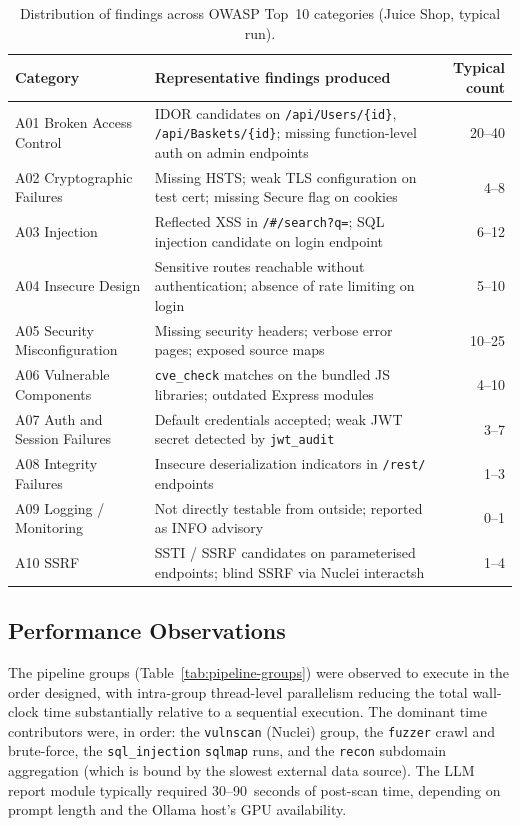 \begin{table}[h]
\centering
\small
\begin{tabular}{|l|p{7cm}|r|}
\hline
\textbf{Category} & \textbf{Representative findings produced} & \textbf{Typical count} \\
\hline
A01 Broken Access Control     & IDOR candidates on \texttt{/api/Users/\{id\}}, \texttt{/api/Baskets/\{id\}}; missing function-level auth on admin endpoints & 20--40 \\
A02 Cryptographic Failures    & Missing HSTS; weak TLS configuration on test cert; missing Secure flag on cookies & 4--8 \\
A03 Injection                 & Reflected XSS in \texttt{/\#/search?q=}; SQL injection candidate on login endpoint & 6--12 \\
A04 Insecure Design           & Sensitive routes reachable without authentication; absence of rate limiting on login & 5--10 \\
A05 Security Misconfiguration & Missing security headers; verbose error pages; exposed source maps & 10--25 \\
A06 Vulnerable Components     & \texttt{cve\_check} matches on the bundled JS libraries; outdated Express modules & 4--10 \\
A07 Auth and Session Failures & Default credentials accepted; weak JWT secret detected by \texttt{jwt\_audit} & 3--7 \\
A08 Integrity Failures        & Insecure deserialization indicators in \texttt{/rest/} endpoints & 1--3 \\
A09 Logging / Monitoring      & Not directly testable from outside; reported as INFO advisory & 0--1 \\
A10 SSRF                      & SSTI / SSRF candidates on parameterised endpoints; blind SSRF via Nuclei interactsh & 1--4 \\
\hline
\end{tabular}
\caption{Distribution of findings across OWASP Top~10 categories (Juice Shop, typical run).}
\label{tab:owasp-coverage}
\end{table}

\subsection{Performance Observations}

The pipeline groups (Table~\ref{tab:pipeline-groups}) were observed to execute in the order designed, with intra-group thread-level parallelism reducing the total wall-clock time substantially relative to a sequential execution. The dominant time contributors were, in order: the \texttt{vulnscan} (Nuclei) group, the \texttt{fuzzer} crawl and brute-force, the \texttt{sql\_injection} \texttt{sqlmap} runs, and the \texttt{recon} subdomain aggregation (which is bound by the slowest external data source). The LLM report module typically required 30--90~seconds of post-scan time, depending on prompt length and the Ollama host's GPU availability.

